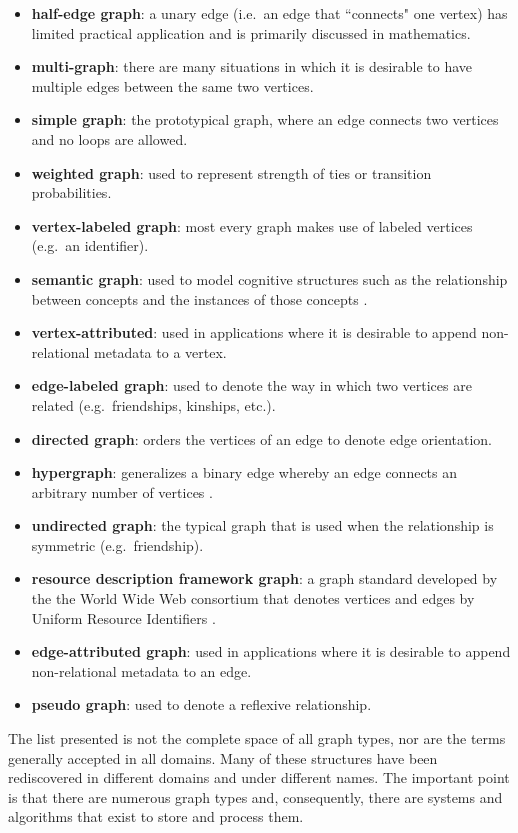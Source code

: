 \documentclass{svmult}
\begin{document}
\begin{itemize}
	\item \textbf{half-edge graph}: a unary edge (i.e.~an edge that ``connects" one vertex) has limited practical application and is primarily discussed in mathematics.
	\item \textbf{multi-graph}: there are many situations in which it is desirable to have multiple edges between the same two vertices.
	\item \textbf{simple graph}: the prototypical graph, where an edge connects two vertices and no loops are allowed.
	\item \textbf{weighted graph}: used to represent strength of ties or transition probabilities.
	\item \textbf{vertex-labeled graph}: most every graph makes use of labeled vertices (e.g.~an identifier).
	\item \textbf{semantic graph}: used to model cognitive structures such as the relationship between concepts and the instances of those concepts \cite{sowa:semantic1991}.
	\item \textbf{vertex-attributed}: used in applications where it is desirable to append non-relational metadata to a vertex.
	\item \textbf{edge-labeled graph}: used to denote the way in which two vertices are related (e.g.~friendships, kinships, etc.).
	\item \textbf{directed graph}: orders the vertices of an edge to denote edge orientation.
	\item \textbf{hypergraph}: generalizes a binary edge whereby an edge connects an arbitrary number of vertices \cite{hyper:gallo1993}.
	\item \textbf{undirected graph}: the typical graph that is used when the relationship is symmetric (e.g.~friendship).
	\item \textbf{resource description framework graph}: a graph standard developed by the the World Wide Web consortium that denotes vertices and edges by Uniform Resource Identifiers \cite{rdfintro:miller1998}.
	\item \textbf{edge-attributed graph}: used in applications where it is desirable to append non-relational metadata to an edge.
	\item \textbf{pseudo graph}: used to denote a reflexive relationship.
\end{itemize}
The list presented is not the complete space of all graph types, nor are the terms generally accepted in all domains. Many of these structures have been rediscovered in different domains and under different names. The important point is that there are numerous graph types and, consequently, there are systems and algorithms that exist to store and process them. 
\end{document}
